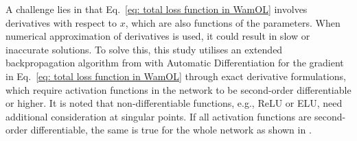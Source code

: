 \documentclass[sigconf, authorversion=true, nonacm=true]{acmart}
\begin{document}
A challenge lies in that Eq.~\eqref{eq: total loss function in WamOL} involves derivatives with respect to $x$, which are also functions of the parameters. When numerical approximation of derivatives is used, it could result in slow or inaccurate solutions. To solve this, this study utilises an extended backpropagation algorithm from \cite{rumelhart1986learning} with Automatic Differentiation for the gradient in Eq.~\eqref{eq: total loss function in WamOL} through exact derivative formulations, which require activation functions in the network to be second-order differentiable or higher. It is noted that non-differentiable functions, e.g., ReLU or ELU, need additional consideration at singular points. If all activation functions are second-order differentiable, the same is true for the whole network as shown in \cite{hornik1990universal, hoshisashi2023no}.
\end{document}

